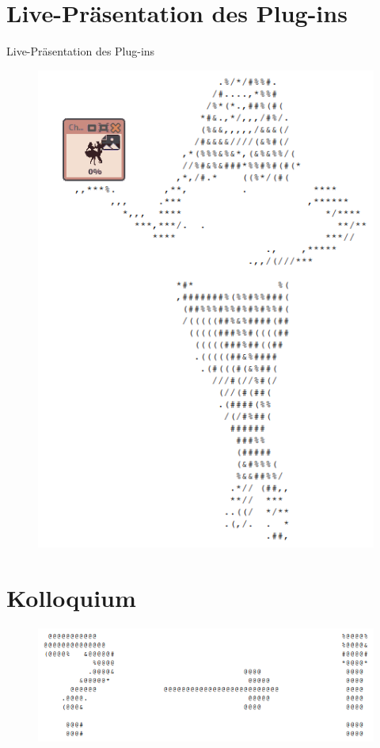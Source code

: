 \documentclass{beamer}
\begin{document}
\section{Live-Präsentation des Plug-ins}
\begin{frame}{Live-Präsentation des Plug-ins}
\begin{figure}
\center
\begin{minipage}{.45\textwidth}
\includegraphics[width=\textwidth]{figures/presenting-plugin/presenting-plugin-composition.png}
\end{minipage}
\end{figure}
\end{frame}

\section{Kolloquium}
\begin{frame}
\begin{figure}
\center
\begin{minipage}{0.8\textwidth}
\includegraphics[width=\textwidth]{figures/kolloquium/kolloquium-ascii-art.png}
\end{minipage}
\end{figure}
\end{frame}
\end{document}
